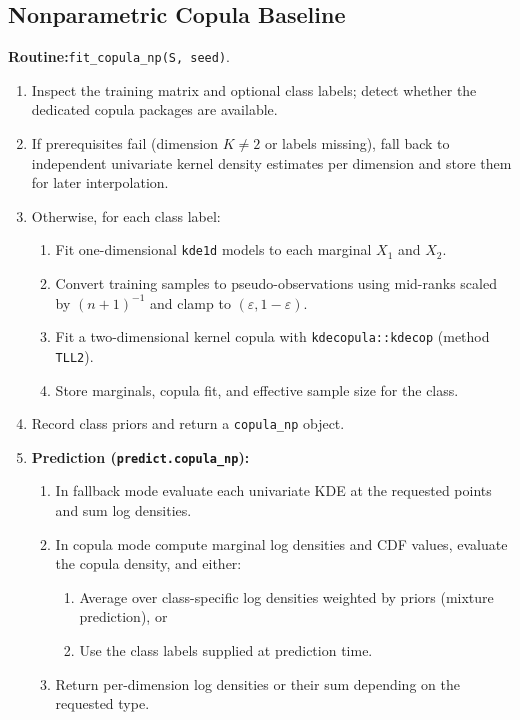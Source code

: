 \documentclass[11pt,a4paper,twoside]{book}\usepackage[]{graphicx}\usepackage[]{xcolor}
\begin{document}
\subsection{Nonparametric Copula Baseline}\label{app:copula}

\textbf{Routine:}\quad\texttt{fit\_copula\_np(S, seed)}.

\begin{enumerate}
  \item Inspect the training matrix and optional class labels; detect whether the dedicated copula packages are available.
  \item If prerequisites fail (dimension $K \neq 2$ or labels missing), fall back to independent univariate kernel density estimates per dimension and store them for later interpolation.
  \item Otherwise, for each class label:
    \begin{enumerate}
      \item Fit one-dimensional \texttt{kde1d} models to each marginal $X_1$ and $X_2$.
      \item Convert training samples to pseudo-observations using mid-ranks scaled by $(n+1)^{-1}$ and clamp to $(\varepsilon, 1-\varepsilon)$.
      \item Fit a two-dimensional kernel copula with \texttt{kdecopula::kdecop} (method \texttt{TLL2}).
      \item Store marginals, copula fit, and effective sample size for the class.
    \end{enumerate}
  \item Record class priors and return a \texttt{copula\_np} object.

  \item \textbf{Prediction (\texttt{predict.copula\_np}):}
    \begin{enumerate}
      \item In fallback mode evaluate each univariate KDE at the requested points and sum log densities.
      \item In copula mode compute marginal log densities and CDF values, evaluate the copula density, and either:
        \begin{enumerate}
          \item Average over class-specific log densities weighted by priors (mixture prediction), or
          \item Use the class labels supplied at prediction time.
        \end{enumerate}
      \item Return per-dimension log densities or their sum depending on the requested type.
    \end{enumerate}
\end{enumerate}
\end{document}
